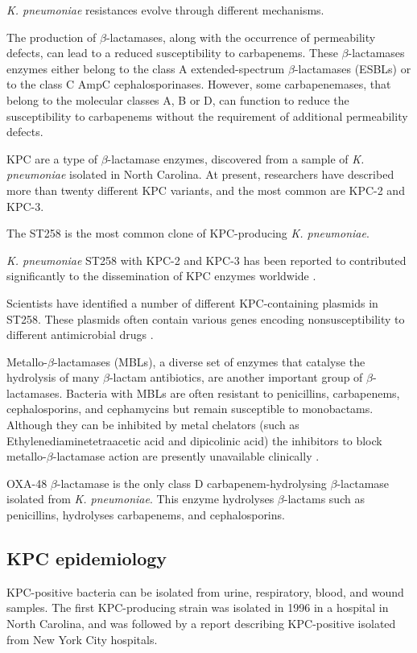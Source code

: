 \documentclass[11pt]{report}
\begin{document}
\emph{K. pneumoniae} resistances evolve through different mechanisms.

The production of $\beta$-lactamases, along with the occurrence of permeability defects, can lead to a reduced susceptibility to carbapenems.
These $\beta$-lactamases enzymes either belong to the class A extended-spectrum $\beta$-lactamases (ESBLs) or to the class C AmpC cephalosporinases.
However, some carbapenemases, that belong to the molecular classes A, B or D, can function to reduce the susceptibility to carbapenems without the requirement of additional permeability defects.

KPC are a type of $\beta$-lactamase enzymes, discovered from a sample of \emph{K. pneumoniae} isolated in North Carolina.
At present, researchers have described more than twenty different KPC variants, and the most common are KPC-2 and KPC-3.

The ST258 is the most common clone of KPC-producing \emph{K. pneumoniae}.

\emph{K. pneumoniae} ST258 with KPC-2 and KPC-3 has been reported to contributed significantly to the dissemination of KPC enzymes worldwide \cite{pitout2015}.

Scientists have identified a number of different KPC-containing plasmids in ST258.
These plasmids often contain various genes encoding nonsusceptibility to different antimicrobial drugs \cite{pitout2015}.

Metallo-$\beta$-lactamases (MBLs), a diverse set of enzymes that catalyse the hydrolysis of many $\beta$-lactam antibiotics, are another important group of $\beta$-lactamases.
Bacteria with MBLs are often resistant to penicillins, carbapenems, cephalosporins, and cephamycins but remain susceptible to monobactams.
Although they can be inhibited by metal chelators (such as Ethylenediaminetetraacetic acid and dipicolinic acid) the inhibitors to block metallo-$\beta$-lactamase action are presently unavailable clinically \cite{palzkill2013metallo}.

OXA-48 $\beta$-lactamase is the only class D carbapenem-hydrolysing $\beta$-lactamase isolated from \emph{K. pneumoniae}.
This enzyme hydrolyses $\beta$-lactams such as penicillins, hydrolyses carbapenems, and cephalosporins.


\subsection{KPC epidemiology}

KPC-positive bacteria can be isolated from urine, respiratory, blood, and wound samples.
The first KPC-producing strain was isolated in 1996 in a hospital in North Carolina, and was followed by a report describing KPC-positive isolated from New York City hospitals.
\end{document}
